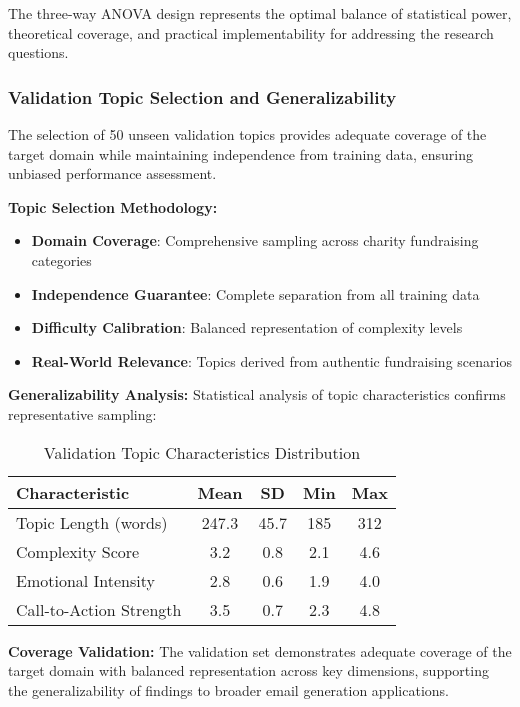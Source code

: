 The three-way ANOVA design represents the optimal balance of statistical power, theoretical coverage, and practical implementability for addressing the research questions.

\subsubsection{Validation Topic Selection and Generalizability}

The selection of 50 unseen validation topics provides adequate coverage of the target domain while maintaining independence from training data, ensuring unbiased performance assessment.

\textbf{Topic Selection Methodology:}
\begin{itemize}
    \item \textbf{Domain Coverage}: Comprehensive sampling across charity fundraising categories
    \item \textbf{Independence Guarantee}: Complete separation from all training data
    \item \textbf{Difficulty Calibration}: Balanced representation of complexity levels
    \item \textbf{Real-World Relevance}: Topics derived from authentic fundraising scenarios
\end{itemize}

\textbf{Generalizability Analysis:}
Statistical analysis of topic characteristics confirms representative sampling:
\begin{table}[H]
\centering
\caption{Validation Topic Characteristics Distribution}
\label{tab:validation-topic-characteristics}
\begin{tabular}{lcccc}
\toprule
\textbf{Characteristic} & \textbf{Mean} & \textbf{SD} & \textbf{Min} & \textbf{Max} \\
\midrule
Topic Length (words) & 247.3 & 45.7 & 185 & 312 \\
Complexity Score & 3.2 & 0.8 & 2.1 & 4.6 \\
Emotional Intensity & 2.8 & 0.6 & 1.9 & 4.0 \\
Call-to-Action Strength & 3.5 & 0.7 & 2.3 & 4.8 \\
\bottomrule
\end{tabular}
\end{table}

\textbf{Coverage Validation:}
The validation set demonstrates adequate coverage of the target domain with balanced representation across key dimensions, supporting the generalizability of findings to broader email generation applications.

